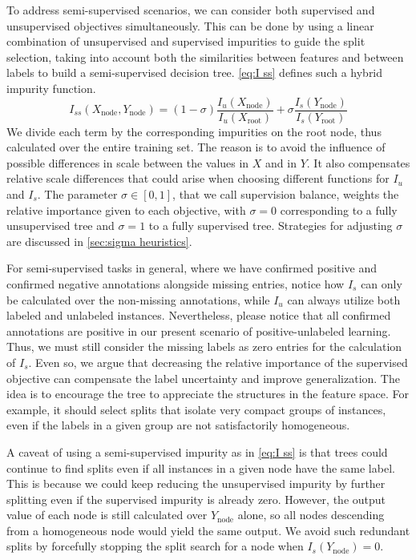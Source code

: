 To address semi-supervised scenarios, we can consider both supervised and unsupervised objectives simultaneously. This can be done by using a linear combination of unsupervised and supervised impurities to guide the split selection, taking into account both the similarities between features and between labels to build a semi-supervised decision tree.
\autoref{eq:I ss} defines such a hybrid impurity function.
%
\begin{equation}
    I_{ss}(X_\text{node}, Y_\text{node}) =
        (1 - \sigma) \frac{I_u(X_\text{node})}{I_u(X_\text{root})}
        + \sigma \frac{I_s(Y_\text{node})}{I_s(Y_\text{root})}
    \label{eq:I ss}
\end{equation}
%
We divide each term by the corresponding impurities on the root node, thus calculated over the entire training set. The reason is to avoid the influence of possible differences in scale between the values in $X$ and in $Y$. It also compensates relative scale differences that could arise when choosing different functions for $I_u$ and $I_s$.
%
The parameter $\sigma \in [0, 1]$, that we call supervision balance,  %
weights the relative importance given to each objective, with $\sigma = 0$ corresponding to a fully unsupervised tree and $\sigma = 1$ to a fully supervised tree. Strategies for adjusting $\sigma$ are discussed in \autoref{sec:sigma heuristics}.

For semi-supervised tasks in general, where we have confirmed positive and confirmed negative annotations alongside missing entries, notice how $I_s$ can only be calculated over the non-missing annotations, while $I_u$ can always utilize both labeled and unlabeled instances.
%
Nevertheless, please notice that all confirmed annotations are positive in our present scenario of positive-unlabeled learning. Thus, we must still consider the missing labels as zero entries for the calculation of $I_s$. Even so, we argue 
that decreasing the relative importance of the supervised objective can compensate the label uncertainty and improve generalization. The idea is to encourage the tree to appreciate the structures in the feature space. For example, it should select splits that isolate very compact groups of instances, even if the labels in a given group are not satisfactorily homogeneous.

A caveat of using a semi-supervised impurity as in \autoref{eq:I ss} is that trees could continue to find splits even if all instances in a given node have the same label. This is because we could keep reducing the unsupervised impurity by further splitting even if the supervised impurity is already zero.
However, the output value of each node is still calculated over $Y_\text{node}$ alone, so all nodes descending from a homogeneous node would yield the same output. We avoid such redundant splits by forcefully stopping the split search for a node when $I_s(Y_\text{node})=0$.

